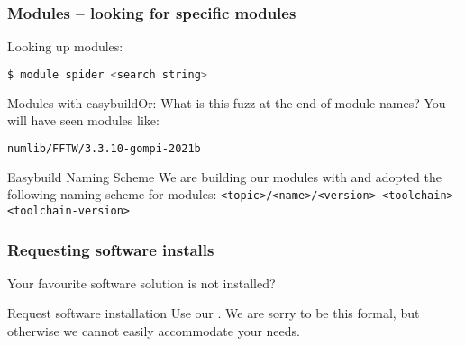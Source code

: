 \begin{frame}[fragile]
  \frametitle{Modules -- looking for specific modules}
  Looking up modules:
  \begin{lstlisting}[language=Bash, style=Shell]
$ module spider <search string>
  \end{lstlisting}
  \pause
\end{frame}

\begin{frame}[fragile]
   {Modules with easybuild\newline Or: What is this fuzz at the end of module names?}
   You will have seen modules like:
   \begin{lstlisting}[language=Bash, style=Shell]
numlib/FFTW/3.3.10-gompi-2021b   
   \end{lstlisting}
   \pause
   \begin{block}{Easybuild Naming Scheme}
    We are building our modules with  and adopted the following naming scheme for modules:\newline
    \footnotesize \verb+<topic>/<name>/<version>-<toolchain>-<toolchain-version>+
   \end{block}
   \pause
\end{frame}

\begin{frame}
  \frametitle{Requesting software installs}
  Your favourite software solution is not installed?
  \begin{exampleblock}{Request software installation}
    Use our .\newline
    We are sorry to be this formal, but otherwise we cannot easily accommodate your needs.
  \end{exampleblock}
  \pause
  \vfill
\end{frame}


